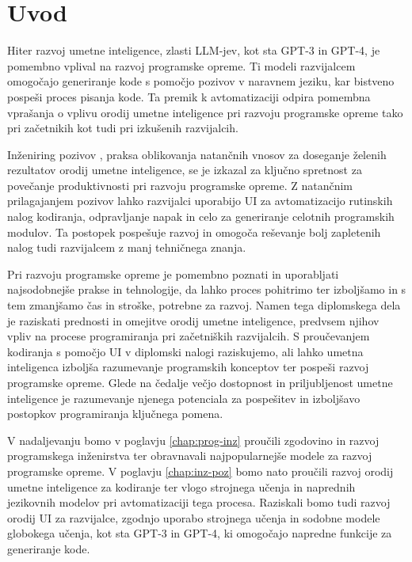 \documentclass[a4paper,12pt,openright]{book}
\begin{document}
\chapter{Uvod}

Hiter razvoj umetne inteligence, zlasti LLM-jev, kot sta GPT-3 in GPT-4, je pomembno vplival na razvoj programske opreme. Ti modeli razvijalcem omogočajo generiranje kode s pomočjo pozivov v naravnem jeziku, kar bistveno pospeši proces pisanja kode. Ta premik k avtomatizaciji odpira pomembna vprašanja o vplivu orodij umetne inteligence pri razvoju programske opreme tako pri začetnikih kot tudi pri izkušenih razvijalcih.


Inženiring pozivov \cite{baidoo2023education}, praksa oblikovanja natančnih vnosov za doseganje želenih rezultatov orodij umetne inteligence, se je izkazal za ključno spretnost za povečanje produktivnosti pri razvoju programske opreme. Z natančnim prilagajanjem pozivov lahko razvijalci uporabijo UI za avtomatizacijo rutinskih nalog kodiranja, odpravljanje napak in celo za generiranje celotnih programskih modulov. Ta postopek pospešuje razvoj in omogoča reševanje bolj zapletenih nalog tudi razvijalcem z manj tehničnega znanja.

Pri razvoju programske opreme je pomembno poznati in uporabljati najsodobnejše prakse in tehnologije, da lahko proces pohitrimo ter izboljšamo in s tem zmanjšamo čas in stroške, potrebne za razvoj.
Namen tega diplomskega dela je raziskati prednosti in omejitve orodij umetne inteligence, predvsem njihov vpliv na procese programiranja  pri začetniških razvijalcih. S proučevanjem kodiranja s pomočjo UI v diplomski nalogi raziskujemo, ali lahko umetna inteligenca izboljša razumevanje programskih konceptov ter pospeši razvoj programske opreme. Glede na čedalje večjo dostopnost in priljubljenost umetne inteligence je razumevanje njenega potenciala za pospešitev in izboljšavo postopkov programiranja ključnega pomena.

V nadaljevanju bomo v poglavju \ref{chap:prog-inz} proučili zgodovino in razvoj programskega inženirstva ter obravnavali najpopularnejše modele za razvoj programske opreme. V poglavju \ref{chap:inz-poz} bomo nato proučili razvoj orodij umetne inteligence za kodiranje ter vlogo strojnega učenja in naprednih jezikovnih modelov pri avtomatizaciji tega procesa. Raziskali bomo tudi razvoj orodij UI za razvijalce, zgodnjo uporabo strojnega učenja in sodobne modele globokega učenja, kot sta GPT-3 in GPT-4, ki omogočajo napredne funkcije za generiranje kode.
\end{document}

